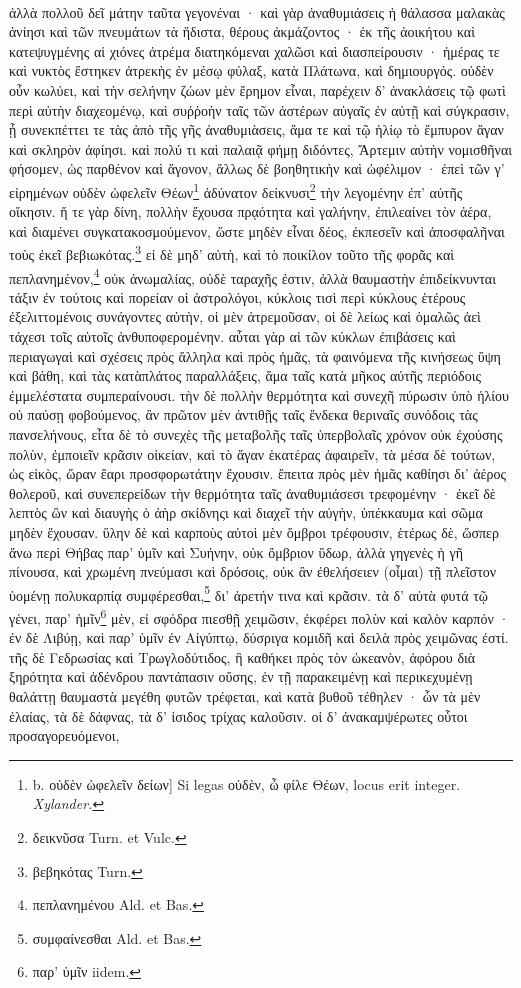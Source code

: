 \documentclass[a4paper, 11pt, oneside, polutonikogreek, german]{article}
\begin{document}
\paragraph{}
ἀλλὰ πολλοῦ δεῖ μάτην ταῦτα γεγονέναι · καὶ γὰρ ἀναθυμιάσεις ἡ θάλασσα μαλακὰς ἀνίησι καὶ τῶν πνευμάτων τὰ ἥδιστα, θέρους ἀκμάζοντος · ἐκ τῆς ἀοικήτου καὶ κατεψυγμένης αἱ χιόνες ἀτρέμα διατηκόμεναι χαλῶσι καὶ διασπείρουσιν · ἡμέρας τε καὶ νυκτὸς ἕστηκεν ἀτρεκὴς ἐν μέσῳ φύλαξ, κατὰ Πλάτωνα, καὶ δημιουργός. οὐδὲν οὖν κωλύει, καὶ τὴν σελήνην ζώων μὲν ἔρημον εἶναι, παρέχειν δ' ἀνακλάσεις τῷ φωτὶ περὶ αὐτὴν διαχεομένῳ, καὶ συῤῥοὴν ταῖς τῶν ἀστέρων αὐγαῖς ἐν αὐτῇ καὶ σύγκρασιν, ᾗ συνεκπέττει τε τὰς ἀπὸ τῆς γῆς ἀναθυμιὰσεις, ἅμα τε καὶ τῷ ἡλίῳ τὸ ἔμπυρον ἄγαν καὶ σκληρὸν ἀφίησι. καὶ πολύ τι καὶ παλαιᾷ φήμῃ διδόντες, Ἄρτεμιν αὐτὴν νομισθῆναι φήσομεν, ὡς παρθένον καὶ ἄγονον, ἄλλως δὲ βοηθητικὴν καὶ ὠφέλιμον · ἐπεὶ τῶν γ' εἰρημένων οὐδὲν ὠφελεῖν Θέων\footnote{b. οὐδὲν ὠφελεῖν δείων] Si legas οὐδὲν, ὦ φίλε Θέων, locus erit integer. \emph{Xylander.}} ἀδύνατον δείκνυσι\footnote{δεικνῦσα Turn. et Vulc.} τὴν λεγομένην ἐπ' αὐτῆς οἴκησιν. ἥ τε γὰρ δίνη, πολλὴν ἔχουσα πρᾳότητα καὶ γαλήνην, ἐπιλεαίνει τὸν ἀέρα, καὶ διαμένει συγκατακοσμούμενον, ὥστε μηδὲν εἶναι δέος, ἐκπεσεῖν καὶ ἀποσφαλῆναι τοὺς ἐκεῖ βεβιωκότας.\footnote{βεβηκότας Turn.} εἰ δὲ μηδ' αὐτὴ, καὶ τὸ ποικίλον τοῦτο τῆς φορᾶς καὶ πεπλανημένον,\footnote{πεπλανημένου Ald. et Bas.} οὐκ ἀνωμαλίας, οὐδὲ ταραχῆς ἐστιν, ἀλλὰ θαυμαστὴν ἐπιδείκνυνται τάξιν ἐν τούτοις καὶ πορείαν οἱ ἀστρολόγοι, κύκλοις τισὶ περὶ κύκλους ἑτέρους ἐξελιττομένοις συνάγοντες αὐτὴν, οἱ μὲν ἀτρεμοῦσαν, οἱ δὲ λείως καὶ ὁμαλῶς ἀεὶ τάχεσι τοῖς αὐτοῖς ἀνθυποφερομένην. αὗται γὰρ αἱ τῶν κύκλων ἐπιβάσεις καὶ περιαγωγαὶ καὶ σχέσεις πρὸς ἄλληλα καὶ πρὸς ἡμᾶς, τὰ φαινόμενα τῆς κινήσεως ὕψη καὶ βάθη, καὶ τὰς κατὰπλάτος παραλλάξεις, ἅμα ταῖς κατὰ μῆκος αὐτῆς περιόδοις ἐμμελέστατα συμπεραίνουσι. τὴν δὲ πολλὴν θερμότητα καὶ συνεχῆ πύρωσιν ὑπὸ ἡλίου οὐ παύσῃ φοβούμενος, ἂν πρῶτον μὲν ἀντιθῇς ταῖς ἕνδεκα θεριναῖς συνόδοις τὰς πανσελήνους, εἶτα δὲ τὸ συνεχὲς τῆς μεταβολῆς ταῖς ὑπερβολαῖς χρόνον οὐκ ἐχούσης πολὺν, ἐμποιεῖν κρᾶσιν οἰκείαν, καὶ τὸ ἄγαν ἑκατέρας ἀφαιρεῖν, τὰ μέσα δὲ τούτων, ὡς εἰκὸς, ὥραν ἔαρι προσφορωτάτην ἔχουσιν. ἔπειτα πρὸς μὲν ἡμᾶς καθίησι δι' ἀέρος θολεροῦ, καὶ συνεπερείδων τὴν θερμότητα ταῖς ἀναθυμιάσεσι τρεφομένην · ἐκεῖ δὲ λεπτὸς ὢν καὶ διαυγὴς ὁ ἀὴρ σκίδνηςι καὶ διαχεῖ τὴν αὐγὴν, ὑπέκκαυμα καὶ σῶμα μηδὲν ἔχουσαν. ὕλην δὲ καὶ καρποὺς αὐτοὶ μὲν ὄμβροι τρέφουσιν, ἑτέρως δὲ, ὥσπερ ἄνω περὶ Θήβας παρ' ὑμῖν καὶ Συήνην, οὐκ ὄμβριον ὕδωρ, ἀλλὰ γηγενὲς ἡ γῆ πίνουσα, καὶ χρωμένη πνεύμασι καὶ δρόσοις, οὐκ ἂν ἐθελήσειεν (οἶμαι) τῇ πλεῖστον ὑομένῃ πολυκαρπίᾳ συμφέρεσθαι,\footnote{συμφαίνεσθαι Ald. et Bas.} δι' ἀρετήν τινα καὶ κρᾶσιν. τὰ δ' αὐτὰ φυτά τῷ γένει, παρ' ἡμῖν\footnote{παρ' ὑμῖν iidem.} μὲν, εἰ σφόδρα πιεσθῇ χειμῶσιν, ἐκφέρει πολὺν καὶ καλὸν καρπόν · ἐν δὲ Λιβύῃ, καὶ παρ' ὑμῖν ἐν Αἰγύπτῳ, δύσριγα κομιδῆ καὶ δειλὰ πρὸς χειμῶνας ἐστί. τῆς δὲ Γεδρωσίας καὶ Τρωγλοδύτιδος, ἣ καθήκει πρὸς τὸν ὠκεανὸν, ἀφόρου διὰ ξηρότητα καὶ ἀδένδρου παντάπασιν οὔσης, ἐν τῇ παρακειμένῃ καὶ περικεχυμένῃ θαλάττῃ θαυμαστὰ μεγέθη φυτῶν τρέφεται, καὶ κατὰ βυθοῦ τέθηλεν · ὧν τὰ μὲν ἐλαίας, τὰ δὲ δάφνας, τὰ δ' ἰσιδος τρίχας καλοῦσιν. οἱ δ' ἀνακαμψέρωτες οὗτοι προσαγορευόμενοι, 
\end{document}
